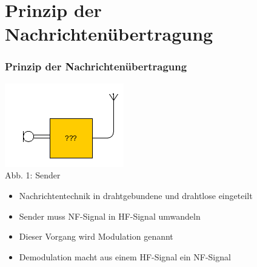 

\subtitle{Technik Klasse E 14: \\
          Modulation \& Demodulation \\[2em]}
\date{Stand 08.01.2015}



\section*{Prinzip der Nachrichtenübertragung}
\begin{frame}
\frametitle{Prinzip der Nachrichtenübertragung}
\begin{center}
\includegraphics[scale=1.]{e14/Sender.png}\\
Abb. 1: Sender\\
\end{center}
\begin{itemize}
	\item Nachrichtentechnik in drahtgebundene und drahtlose eingeteilt
	\item Sender muss NF-Signal in HF-Signal umwandeln
	\item Dieser Vorgang wird Modulation genannt
	\item Demodulation macht aus einem HF-Signal ein NF-Signal
\end{itemize}
\end{frame}

